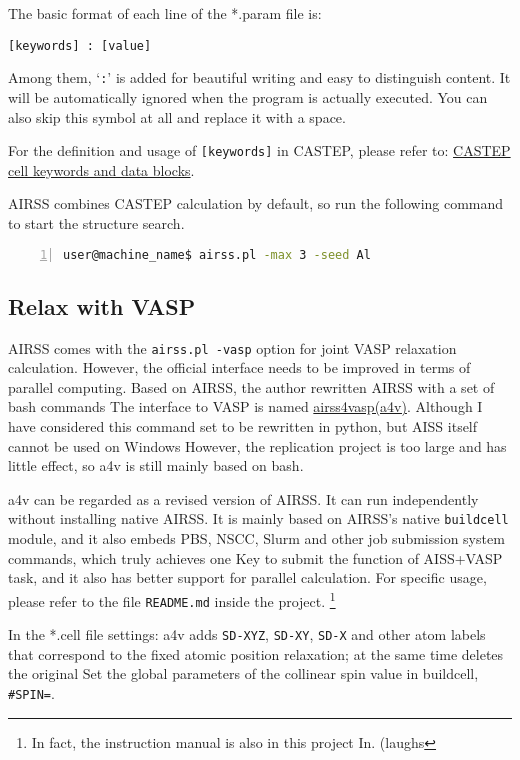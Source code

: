 \documentclass[a4paper, 10pt]{article}
\begin{document}
The basic format of each line of the *.param file is:
\begin{lstlisting}
[keywords] : [value]
\end{lstlisting}
Among them, `\verb|:|' is added for beautiful writing and easy to distinguish content. It will be automatically ignored when the program is actually executed. You can also skip this symbol at all and replace it with a space.

For the definition and usage of \verb|[keywords]| in CASTEP, please refer to: \href{http://www.tcm.phy.cam.ac.uk/castep/documentation/WebHelp/content/modules/castep/keywords/k_main_structure.htm}{CASTEP cell keywords and data blocks}.

AIRSS combines CASTEP calculation by default, so run the following command to start the structure search.
\begin{lstlisting}[language={bash},numbers=left]
user@machine_name$ airss.pl -max 3 -seed Al
\end{lstlisting}

\subsection{Relax with VASP}
AIRSS comes with the \verb|airss.pl -vasp| option for joint VASP relaxation calculation. However, the official interface needs to be improved in terms of parallel computing. Based on AIRSS, the author rewritten AIRSS with a set of bash commands The interface to VASP is named \href{https://github.com/kYangLi/airss4vasp}{airss4vasp(a4v)}. Although I have considered this command set to be rewritten in python, but AISS itself cannot be used on Windows However, the replication project is too large and has little effect, so a4v is still mainly based on bash.

a4v can be regarded as a revised version of AIRSS. It can run independently without installing native AIRSS. It is mainly based on AIRSS's native \verb|buildcell| module, and it also embeds PBS, NSCC, Slurm and other job submission system commands, which truly achieves one Key to submit the function of AISS+VASP task, and it also has better support for parallel calculation. For specific usage, please refer to the file \verb|README.md| inside the project. \footnote{In fact, the instruction manual is also in this project In. (laughs}

In the *.cell file settings: a4v adds \verb|SD-XYZ|, \verb|SD-XY|, \verb|SD-X| and other atom labels that correspond to the fixed atomic position relaxation; at the same time deletes the original Set the global parameters of the collinear spin value in buildcell, \verb|#SPIN=|.
\end{document}

